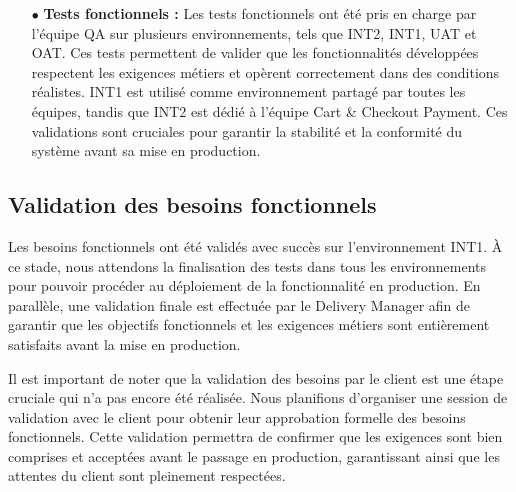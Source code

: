 \begin{itemize}
\begin{center}
        \label{fig:report}
    \end{center}
    \item[$\bullet$] \textbf{Tests fonctionnels :} Les tests fonctionnels ont été pris en charge par l'équipe QA sur plusieurs environnements, tels que INT2, INT1, UAT et OAT. Ces tests permettent de valider que les fonctionnalités développées respectent les exigences métiers et opèrent correctement dans des conditions réalistes. INT1 est utilisé comme environnement partagé par toutes les équipes, tandis que INT2 est dédié à l'équipe Cart \& Checkout Payment. Ces validations sont cruciales pour garantir la stabilité et la conformité du système avant sa mise en production.
\end{itemize}

\subsection{Validation des besoins fonctionnels}
Les besoins fonctionnels ont été validés avec succès sur l'environnement INT1. À ce stade, nous attendons la finalisation des tests dans tous les environnements pour pouvoir procéder au déploiement de la fonctionnalité en production. En parallèle, une validation finale est effectuée par le Delivery Manager afin de garantir que les objectifs fonctionnels et les exigences métiers sont entièrement satisfaits avant la mise en production.

Il est important de noter que la validation des besoins par le client est une étape cruciale qui n'a pas encore été réalisée. Nous planifions d'organiser une session de validation avec le client pour obtenir leur approbation formelle des besoins fonctionnels. Cette validation permettra de confirmer que les exigences sont bien comprises et acceptées avant le passage en production, garantissant ainsi que les attentes du client sont pleinement respectées.

